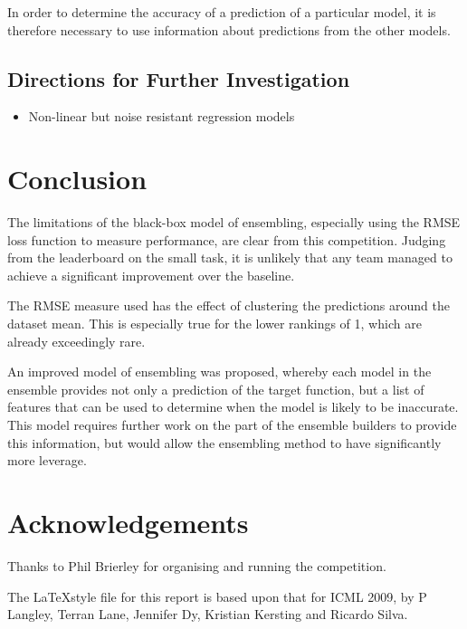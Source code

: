 \documentclass{article}
\begin{document}
In order to determine the accuracy of a prediction of a particular model, it is
therefore necessary to use information about predictions from the other models.


\subsection{}


\subsection{Directions for Further Investigation}

\begin{itemize}
\item Non-linear but noise resistant regression models
\end{itemize}


\section{Conclusion}

The limitations of the black-box model of ensembling, especially using the RMSE loss function to measure performance, are clear from this competition.  Judging from the leaderboard on the small task, it is unlikely that any team managed to achieve a significant improvement over the baseline.

The RMSE measure used has the effect of clustering the predictions around the dataset mean.  This is especially true for the lower rankings of 1, which are already exceedingly rare.

An improved model of ensembling was proposed, whereby each model in the ensemble provides not only a prediction of the target function, but a list of features that can be used to determine when the model is likely to be inaccurate.  This model requires further work on the part of the ensemble builders to provide this information, but would allow the ensembling method to have significantly more leverage.

\section*{Acknowledgements} 

Thanks to Phil Brierley for organising and running the competition.

The \LaTeX style file for this report is based upon that for ICML 2009, by P Langley, Terran Lane, Jennifer Dy, Kristian Kersting and Ricardo Silva.




\end{document}

